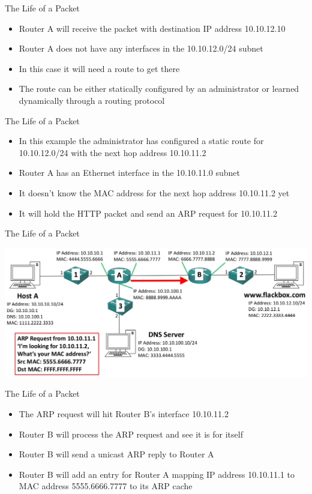 \documentclass[pdflatex,compress,mathserif]{beamer}
\begin{document}
\begin{frame}{The Life of a Packet}
	\begin{itemize}
		\item Router A will receive the packet with destination IP address 10.10.12.10
		\item Router A does not have any interfaces in the 10.10.12.0/24 subnet
		\item In this case it will need a route to get there
		\item The route can be either statically configured by an administrator or learned dynamically through a routing protocol
	\end{itemize}
\end{frame}

\begin{frame}{The Life of a Packet}
	\begin{itemize}
		\item In this example the administrator has configured a static route for 10.10.12.0/24 with the next hop address 10.10.11.2
		\item Router A has an Ethernet interface in the 10.10.11.0 subnet
		\item It doesn’t know the MAC address for the next hop address 10.10.11.2 yet
		\item It will hold the HTTP packet and send an ARP request for 10.10.11.2
	\end{itemize}
\end{frame}

\begin{frame}{The Life of a Packet}
	\begin{center}
		\includegraphics[width=\linewidth]{img/img46}
	\end{center}
\end{frame}

\begin{frame}{The Life of a Packet}
	\begin{itemize}
		\item The ARP request will hit Router B’s interface 10.10.11.2
		\item Router B will process the ARP request and see it is for itself
		\item Router B will send a unicast ARP reply to Router A
		\item Router B will add an entry for Router A mapping IP address 10.10.11.1 to MAC address 5555.6666.7777 to its ARP cache
	\end{itemize}
\end{frame}
\end{document}
